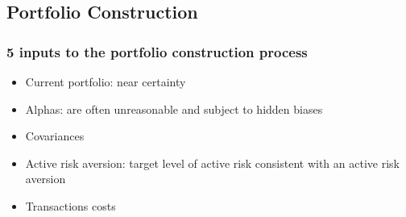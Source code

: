 


\subsection{Portfolio Construction}

\subsubsection{5 inputs to the portfolio construction process}
\begin{itemize}
\item Current portfolio: near certainty
\item Alphas: are often unreasonable and subject to hidden biases
\item Covariances
\item Active risk aversion: target level of active risk consistent with an active risk aversion
\item Transactions costs
\end{itemize}




